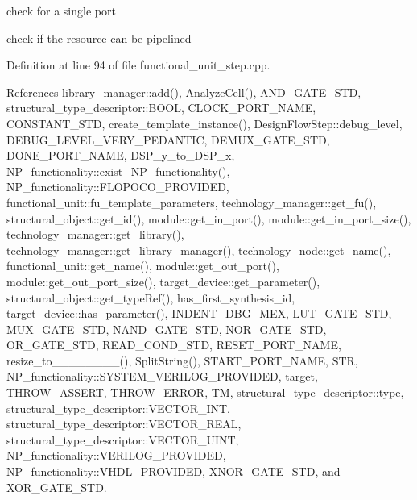 check for a single port

check if the resource can be pipelined 

Definition at line 94 of file functional\+\_\+unit\+\_\+step.\+cpp.



References library\+\_\+manager\+::add(), Analyze\+Cell(), A\+N\+D\+\_\+\+G\+A\+T\+E\+\_\+\+S\+TD, structural\+\_\+type\+\_\+descriptor\+::\+B\+O\+OL, C\+L\+O\+C\+K\+\_\+\+P\+O\+R\+T\+\_\+\+N\+A\+ME, C\+O\+N\+S\+T\+A\+N\+T\+\_\+\+S\+TD, create\+\_\+template\+\_\+instance(), Design\+Flow\+Step\+::debug\+\_\+level, D\+E\+B\+U\+G\+\_\+\+L\+E\+V\+E\+L\+\_\+\+V\+E\+R\+Y\+\_\+\+P\+E\+D\+A\+N\+T\+IC, D\+E\+M\+U\+X\+\_\+\+G\+A\+T\+E\+\_\+\+S\+TD, D\+O\+N\+E\+\_\+\+P\+O\+R\+T\+\_\+\+N\+A\+ME, D\+S\+P\+\_\+y\+\_\+to\+\_\+\+D\+S\+P\+\_\+x, N\+P\+\_\+functionality\+::exist\+\_\+\+N\+P\+\_\+functionality(), N\+P\+\_\+functionality\+::\+F\+L\+O\+P\+O\+C\+O\+\_\+\+P\+R\+O\+V\+I\+D\+ED, functional\+\_\+unit\+::fu\+\_\+template\+\_\+parameters, technology\+\_\+manager\+::get\+\_\+fu(), structural\+\_\+object\+::get\+\_\+id(), module\+::get\+\_\+in\+\_\+port(), module\+::get\+\_\+in\+\_\+port\+\_\+size(), technology\+\_\+manager\+::get\+\_\+library(), technology\+\_\+manager\+::get\+\_\+library\+\_\+manager(), technology\+\_\+node\+::get\+\_\+name(), functional\+\_\+unit\+::get\+\_\+name(), module\+::get\+\_\+out\+\_\+port(), module\+::get\+\_\+out\+\_\+port\+\_\+size(), target\+\_\+device\+::get\+\_\+parameter(), structural\+\_\+object\+::get\+\_\+type\+Ref(), has\+\_\+first\+\_\+synthesis\+\_\+id, target\+\_\+device\+::has\+\_\+parameter(), I\+N\+D\+E\+N\+T\+\_\+\+D\+B\+G\+\_\+\+M\+EX, L\+U\+T\+\_\+\+G\+A\+T\+E\+\_\+\+S\+TD, M\+U\+X\+\_\+\+G\+A\+T\+E\+\_\+\+S\+TD, N\+A\+N\+D\+\_\+\+G\+A\+T\+E\+\_\+\+S\+TD, N\+O\+R\+\_\+\+G\+A\+T\+E\+\_\+\+S\+TD, O\+R\+\_\+\+G\+A\+T\+E\+\_\+\+S\+TD, R\+E\+A\+D\+\_\+\+C\+O\+N\+D\+\_\+\+S\+TD, R\+E\+S\+E\+T\+\_\+\+P\+O\+R\+T\+\_\+\+N\+A\+ME, resize\+\_\+to\+\_\+\_\+\_\+\_\+\_\+\_\+\_\+\_(), Split\+String(), S\+T\+A\+R\+T\+\_\+\+P\+O\+R\+T\+\_\+\+N\+A\+ME, S\+TR, N\+P\+\_\+functionality\+::\+S\+Y\+S\+T\+E\+M\+\_\+\+V\+E\+R\+I\+L\+O\+G\+\_\+\+P\+R\+O\+V\+I\+D\+ED, target, T\+H\+R\+O\+W\+\_\+\+A\+S\+S\+E\+RT, T\+H\+R\+O\+W\+\_\+\+E\+R\+R\+OR, TM, structural\+\_\+type\+\_\+descriptor\+::type, structural\+\_\+type\+\_\+descriptor\+::\+V\+E\+C\+T\+O\+R\+\_\+\+I\+NT, structural\+\_\+type\+\_\+descriptor\+::\+V\+E\+C\+T\+O\+R\+\_\+\+R\+E\+AL, structural\+\_\+type\+\_\+descriptor\+::\+V\+E\+C\+T\+O\+R\+\_\+\+U\+I\+NT, N\+P\+\_\+functionality\+::\+V\+E\+R\+I\+L\+O\+G\+\_\+\+P\+R\+O\+V\+I\+D\+ED, N\+P\+\_\+functionality\+::\+V\+H\+D\+L\+\_\+\+P\+R\+O\+V\+I\+D\+ED, X\+N\+O\+R\+\_\+\+G\+A\+T\+E\+\_\+\+S\+TD, and X\+O\+R\+\_\+\+G\+A\+T\+E\+\_\+\+S\+TD.



